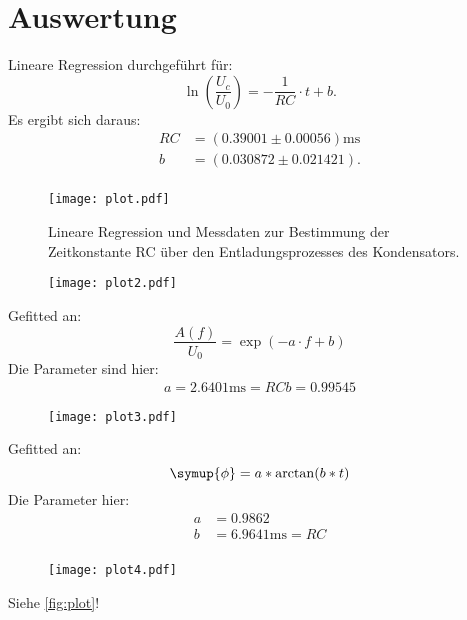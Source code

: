 \section{Auswertung}
\label{sec:Auswertung}
Lineare Regression durchgeführt für:
\begin{equation*}
    \ln\left(\frac{U_c}{U_0}\right)=-\frac{1}{RC}\cdot t + b.
\end{equation*}
Es ergibt sich daraus:
\begin{align*}
  RC &= (0.39001\pm 0.00056)\unit{\milli\second}\\
  b &= (0.030872\pm 0.021421).\\
\end{align*}
\begin{figure}
  \centering
  \texttt{[image: plot.pdf]}
  \caption{Lineare Regression und Messdaten zur Bestimmung der Zeitkonstante RC über den Entladungsprozesses des Kondensators.}
  \label{fig:plot}
\end{figure}

\begin{figure}
  \centering
  \texttt{[image: plot2.pdf]}
  \caption{}
  \label{fig:plot2}
\end{figure}
Gefitted an:
\begin{equation*}
  \frac{A(f)}{U_0} = \exp(-a\cdot f + b)
\end{equation*}
Die Parameter sind hier:
\begin{align*}
  a = 2.6401 \unit{\milli\second} = RC
  b = 0.99545
\end{align*}

\begin{figure}
  \centering
  \texttt{[image: plot3.pdf]}
  \caption{}
  \label{fig:plot3}
\end{figure}
Gefitted an:
\begin{equation*}
  \symup{\phi} = a*\arctan(b*t)
\end{equation*}
Die Parameter hier:
\begin{align*}
  a &=0.9862 \\
  b &=6.9641 \unit{\milli\second} = RC \\
\end{align*}

\begin{figure}
  \centering
  \texttt{[image: plot4.pdf]}
  \caption{}
  \label{fig:plot4}
\end{figure}

Siehe \autoref{fig:plot}!
